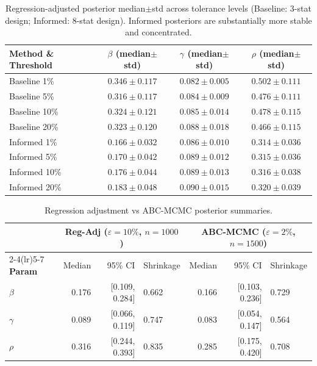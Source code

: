 \documentclass[12pt]{article}
\begin{document}
\begin{table}[h]
\centering
\small
\begin{tabular}{lccc}
\toprule
\textbf{Method \& Threshold} & \textbf{$\beta$ (median$\pm$std)} & \textbf{$\gamma$ (median$\pm$std)} & \textbf{$\rho$ (median$\pm$std)} \\
\midrule
Baseline 1\%  & $0.346\pm0.117$ & $0.082\pm0.005$ & $0.502\pm0.111$ \\
Baseline 5\%  & $0.316\pm0.117$ & $0.084\pm0.009$ & $0.476\pm0.111$ \\
Baseline 10\% & $0.324\pm0.121$ & $0.085\pm0.014$ & $0.478\pm0.115$ \\
Baseline 20\% & $0.323\pm0.120$ & $0.088\pm0.018$ & $0.466\pm0.115$ \\
\midrule
Informed 1\%  & $0.166\pm0.032$ & $0.086\pm0.010$ & $0.314\pm0.036$ \\
Informed 5\%  & $0.170\pm0.042$ & $0.089\pm0.012$ & $0.315\pm0.036$ \\
Informed 10\% & $0.176\pm0.044$ & $0.089\pm0.013$ & $0.316\pm0.038$ \\
Informed 20\% & $0.183\pm0.048$ & $0.090\pm0.015$ & $0.320\pm0.039$ \\
\bottomrule
\end{tabular}
\caption{Regression-adjusted posterior median$\pm$std across tolerance levels (Baseline: 3-stat design; Informed: 8-stat design). Informed posteriors are substantially more stable and concentrated.}
\label{tab:regadj_stability}
\end{table}

\begin{table}[h]
\centering
\small
\begin{tabular}{lrrlrrl}
\toprule
 & \multicolumn{3}{c}{\textbf{Reg-Adj} ($\varepsilon=10\%$, $n=1000$)} & \multicolumn{3}{c}{\textbf{ABC-MCMC} ($\varepsilon=2\%$, $n=1500$)} \\
\cmidrule(lr){2-4}\cmidrule(lr){5-7}
\textbf{Param} & Median & 95\% CI & Shrinkage & Median & 95\% CI & Shrinkage \\
\midrule
$\beta$ & 0.176 & [0.109, 0.284] & 0.662 & 0.166 & [0.103, 0.236] & 0.729 \\
$\gamma$ & 0.089 & [0.066, 0.119] & 0.747 & 0.083 & [0.054, 0.147] & 0.564 \\
$\rho$   & 0.316 & [0.244, 0.393] & 0.835 & 0.285 & [0.175, 0.420] & 0.708 \\
\bottomrule
\end{tabular}
\caption{Regression adjustment vs ABC-MCMC posterior summaries.}
\label{tab:reg_adj}
\end{table}
\end{document}
